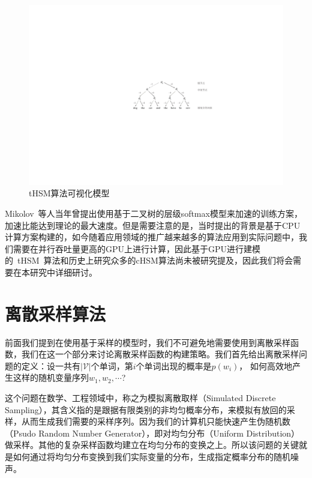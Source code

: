 \begin{figure}[!t]
  \centering
\includegraphics[width=.85\linewidth]{./figures/thsm-example.pdf}
\caption{tHSM算法可视化模型}\label{fig:case_thsm}
\end{figure}

Mikolov~等人当年曾提出使用基于二叉树的层级softmax模型来加速的训练方案，加速比能达到理论的最大速度。但是需要注意的是，当时提出的背景是基于CPU计算方案构建的，如今随着应用领域的推广越来越多的算法应用到实际问题中，我们需要在并行吞吐量更高的GPU上进行计算，因此基于GPU进行建模的~tHSM~算法和历史上研究众多的cHSM算法尚未被研究提及，因此我们将会需要在本研究中详细研讨。

\section{离散采样算法}
前面我们提到在使用基于采样的模型时，我们不可避免地需要使用到离散采样函数，我们在这一个部分来讨论离散采样函数的构建策略。我们首先给出离散采样问题的定义：设一共有$|\mathcal{V}|$个单词，第$i$个单词出现的概率是$p(w_i)$， 如何高效地产生这样的随机变量序列$w_1,w_2,\cdots$?

这个问题在数学、工程领域中，称之为模拟离散取样（Simulated Discrete Sampling），其含义指的是跟据有限类别的非均匀概率分布，来模拟有放回的采样，从而生成我们需要的采样序列。因为我们的计算机只能快速产生伪随机数（Psudo Random Number Generator），即对均匀分布（Uniform Distribution）做采样。其他的复杂采样函数均建立在均匀分布的变换之上。所以该问题的关键就是如何通过将均匀分布变换到我们实际变量的分布，生成指定概率分布的随机噪声。

